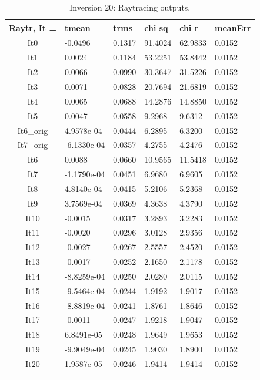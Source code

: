 \documentclass[fontsize=11pt, %
                             paper=a4, %
                             twoside, %
                             captions=tableheading,
                             index=totoc,
                             hyperref]{labbook}
\begin{document}
\begin{addmargin}[4cm]{0cm}
\begin{table}[!ht]
\label{tab:r20}
\raggedleft
\begin{tabular}{c l l l l l}
\toprule
\textbf{Raytr, It = } & \textbf{tmean} & \textbf{trms} & \textbf{chi sq} & \textbf{chi r} & \textbf{meanErr} \\
\toprule
It0 & -0.0496 & 0.1317 & 91.4024 & 62.9833 & 0.0152\\
It1 & 0.0024 & 0.1184 & 53.2251 & 53.8442 & 0.0152\\
It2 & 0.0066 & 0.0990 & 30.3647 & 31.5226 & 0.0152\\
It3 & 0.0071 & 0.0828 & 20.7694 & 21.6819 & 0.0152\\
It4 & 0.0065 & 0.0688 & 14.2876 & 14.8850 & 0.0152\\
It5 & 0.0047 & 0.0558 & 9.2968 & 9.6312 & 0.0152\\
It6\_orig & 4.9578e-04 & 0.0444 & 6.2895 & 6.3200 & 0.0152\\
It7\_orig & -6.1330e-04 & 0.0357 & 4.2755 & 4.2476 & 0.0152\\
It6 & 0.0088 & 0.0660 & 10.9565 & 11.5418 & 0.0152\\
It7 & -1.1790e-04 & 0.0451 & 6.9680 & 6.9605 & 0.0152\\
It8 & 4.8140e-04 & 0.0415 & 5.2106 & 5.2368 & 0.0152\\
It9 & 3.7569e-04 & 0.0369 & 4.3638 & 4.3790 & 0.0152\\
It10 & -0.0015 & 0.0317 & 3.2893 & 3.2283 & 0.0152\\
It11 & -0.0020 & 0.0296 & 3.0128 & 2.9356 & 0.0152\\
It12 & -0.0027 & 0.0267 & 2.5557 & 2.4520 & 0.0152\\
It13 & -0.0017 & 0.0252 & 2.1650 & 2.1178 & 0.0152\\
It14 & -8.8259e-04 & 0.0250 & 2.0280 & 2.0115 & 0.0152\\
It15 & -9.5464e-04 &  0.0244 & 1.9192 & 1.9017 & 0.0152\\
It16 & -8.8819e-04 & 0.0241 & 1.8761 & 1.8646 & 0.0152\\
It17 & -0.0011 & 0.0247 & 1.9218 & 1.9047 & 0.0152\\
It18 & 6.8491e-05 & 0.0248 & 1.9649 & 1.9653 & 0.0152\\
It19 & -9.9049e-04 & 0.0245 & 1.9030 & 1.8900 & 0.0152\\
It20 & 1.9587e-05 & 0.0246 & 1.9414 & 1.9414 & 0.0152\\
\bottomrule\\
\end{tabular}
\caption{Inversion 20: Raytracing outputs.}
\end{table}


\end{addmargin}
\end{document}
